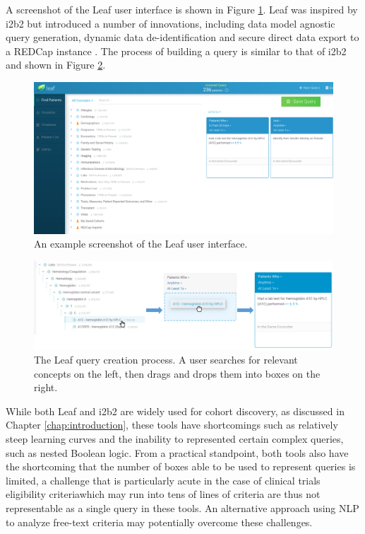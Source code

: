 \documentclass[../main.tex]{subfiles}
\begin{document}
A screenshot of the Leaf user interface is shown in Figure \ref{fig_leaf}. Leaf was inspired by i2b2 but introduced a number of innovations, including data model agnostic query generation, dynamic data de-identification and secure direct data export to a REDCap instance \cite{harris2009research}. The process of building a query is similar to that of i2b2 and shown in Figure \ref{fig_leaf_drag}.

\begin{figure}[h!]
  \includegraphics[scale=0.34]{Figures/2_background/leaf_full.png}  
\caption{An example screenshot of the Leaf user interface.}
\label{fig_leaf}
\end{figure}

\begin{figure}[h!]
  \includegraphics[scale=0.59]{Figures/2_background/leaf.pdf}  
\caption{The Leaf query creation process. A user searches for relevant concepts on the left, then drags and drops them into boxes on the right.}
\label{fig_leaf_drag}
\end{figure}

While both Leaf and i2b2 are widely used for cohort discovery, as discussed in Chapter \ref{chap:introduction}, these tools have shortcomings such as relatively steep learning curves and the inability to represented certain complex queries, such as nested Boolean logic. From a practical standpoint, both tools also have the shortcoming that the number of boxes able to be used to represent queries is limited, a challenge that is particularly acute in the case of clinical trials eligibility criteria\textemdash which may run into tens of lines of criteria \textemdash are thus not representable as a single query in these tools. An alternative approach using NLP to analyze free-text criteria may potentially overcome these challenges.
\end{document}
